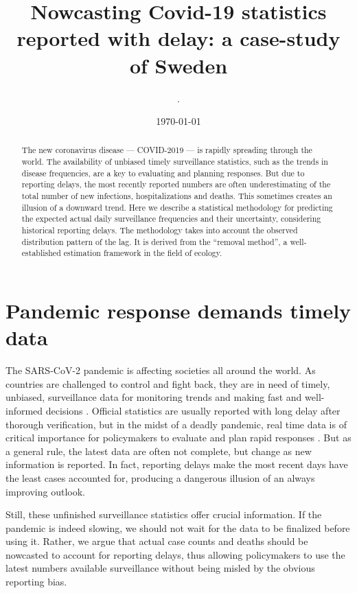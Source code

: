 \documentclass[a4paper,11pth]{article}
\title{Nowcasting Covid-19 statistics reported with delay: a case-study of Sweden}
\date{\today}
\author{
.
}
\begin{document}
    \maketitle
    \begin{abstract}
        The new coronavirus disease --- COVID-2019 --- is rapidly spreading through the world. The availability of unbiased timely surveillance statistics, such as the trends in disease frequencies, are a key to evaluating and planning responses. But due to reporting delays, the most recently reported numbers are often underestimating of the total number of new infections, hospitalizations and deaths. This sometimes creates an illusion of a downward trend. Here we describe a statistical methodology for predicting the expected actual daily surveillance frequencies and their uncertainty, considering historical reporting delays. The methodology takes into account the observed distribution pattern of the lag. It is derived from the ``removal method'', a well-established estimation framework in the field of ecology.
	\end{abstract}
\section{Pandemic response demands timely data}
The SARS-CoV-2 pandemic is affecting societies all around the world. As countries are challenged to control and fight back, they are in need of timely, unbiased, surveillance data for monitoring trends and making fast and well-informed decisions \citep{No_author_2020_coronavirus_three}. Official statistics are usually reported with long delay after thorough verification, but in the midst of a deadly pandemic, real time data is of critical importance for policymakers to evaluate and plan rapid responses \citep{Jajosky2004_evaluation_reporting}. But as a general rule, the latest data are often not complete, but change as new information is reported. In fact, reporting delays make the most recent days have the least cases accounted for, producing a dangerous illusion of an always improving outlook.

Still, these unfinished surveillance statistics offer crucial information. If the pandemic is indeed slowing, we should not wait for the data to be finalized before using it. Rather, we argue that actual case counts and deaths should be nowcasted to account for reporting delays, thus allowing policymakers to use the latest numbers available surveillance without being misled by the obvious reporting bias.
\end{document}
